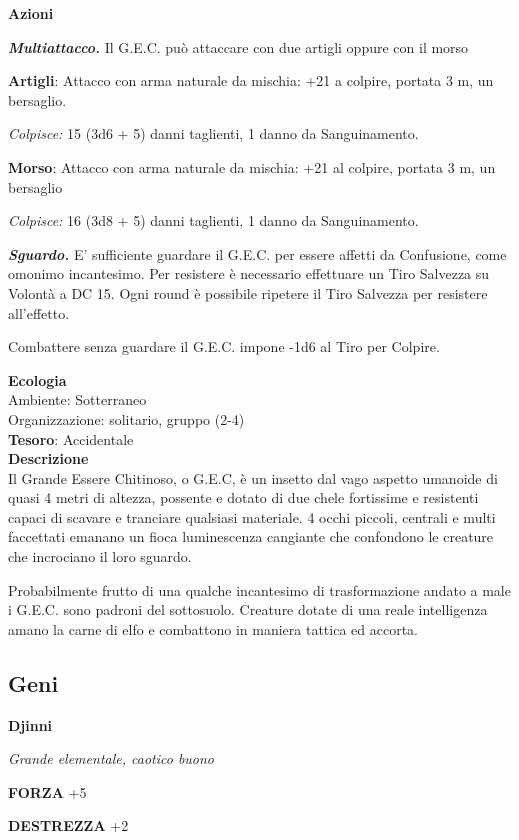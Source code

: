 \begin{multicols}{2}
	\textbf{Azioni}

	\textit{\textbf{Multiattacco.}} Il G.E.C. può attaccare con due artigli oppure con il morso

	\textbf{Artigli}: Attacco con arma naturale da mischia: +21 a colpire, portata 3 m, un bersaglio.

	\textit{Colpisce:} 15 (3d6 + 5) danni taglienti, 1 danno da Sanguinamento.

	\textbf{Morso}: Attacco con arma naturale da mischia: +21 al colpire, portata 3 m, un bersaglio

	\textit{Colpisce:} 16 (3d8 + 5) danni taglienti, 1 danno da Sanguinamento.

	\textit{\textbf{Sguardo.}} E' sufficiente guardare il G.E.C. per essere affetti da Confusione, come omonimo incantesimo. Per resistere è necessario effettuare un Tiro Salvezza su Volontà a DC 15. Ogni round è possibile ripetere il Tiro Salvezza per resistere all'effetto.

	Combattere senza guardare il G.E.C. impone -1d6 al Tiro per Colpire.

	\textbf{Ecologia}\\
	Ambiente: Sotterraneo\\
	Organizzazione: solitario, gruppo (2-4) \\
	\textbf{Tesoro}: Accidentale\\
	\textbf{Descrizione}\\
	Il Grande Essere Chitinoso, o G.E.C, è un insetto dal vago aspetto umanoide di quasi 4 metri di altezza, possente e dotato di due chele fortissime e resistenti capaci di scavare e tranciare qualsiasi materiale. 4 occhi piccoli, centrali e multi faccettati emanano un fioca luminescenza cangiante che confondono le creature che incrociano il loro sguardo.

	Probabilmente frutto di una qualche incantesimo di trasformazione andato a male i G.E.C. sono padroni del sottosuolo. Creature dotate di una reale intelligenza amano la carne di elfo e combattono in maniera tattica ed accorta.

	\subsection{Geni}

	\medskip{}\textbf{Djinni}

	\textit{Grande elementale, caotico buono}

	\textbf{FORZA} +5

	\textbf{DESTREZZA} +2


\end{multicols}
